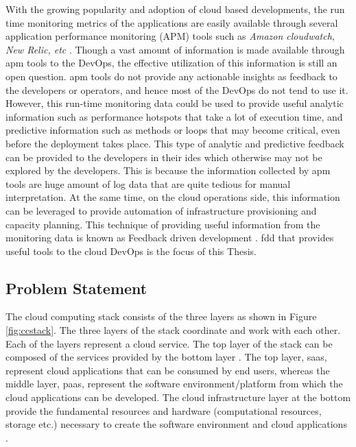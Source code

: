 \documentclass[article,type=msc,colorback,12pt,accentcolor=tud8b,table]{tudthesis}
\begin{document}
	\par With the growing popularity and adoption of cloud based developments, the run time monitoring metrics of the applications are easily available through several application performance monitoring (APM) tools such as \textit{Amazon cloudwatch, New Relic, etc} \cite{cloudwatch, newrelic}.  Though a vast amount of information is made available through \gls{apm} tools to the DevOps, the effective utilization of this information is still an open question. \gls{apm} tools do not provide any actionable insights as feedback to the developers or operators, and hence most of the DevOps do not tend to use it. However, this run-time monitoring data could be used to provide useful analytic information such as performance hotspots that take a lot of execution time, and predictive information such as methods or loops that may become critical, even before the deployment takes place. This type of analytic and predictive feedback can be provided to the developers in their \gls{ide}s which otherwise may not be explored by the developers. This is because the information collected by \gls{apm} tools are huge amount of log data that are quite tedious for manual interpretation. At the same time, on the cloud operations side, this information can be leveraged to provide automation of infrastructure provisioning and capacity planning. This technique of providing useful information from the monitoring data is known as Feedback driven development \cite{cito2015runtime}. \gls{fdd} that provides useful tools to the cloud DevOps is the focus of this Thesis.	
	
	\subsection{Problem Statement}	
	
The cloud computing stack consists of the three layers as shown in Figure \ref{fig:ccstack}. The three layers of the stack coordinate and work with each other. Each of the layers represent a cloud service. The top layer of the stack can be composed of the services provided by the bottom layer \cite{youseff2008toward}. The top layer, \gls{saas}, represent cloud applications that can be consumed by end users, whereas the middle layer, \gls{paas}, represent the software environment/platform from which the cloud applications can be developed. The cloud infrastructure layer at the bottom provide the fundamental resources and hardware (computational resources, storage etc.) necessary to create the software environment and cloud applications \cite{youseff2008toward}.  
\end{document}
